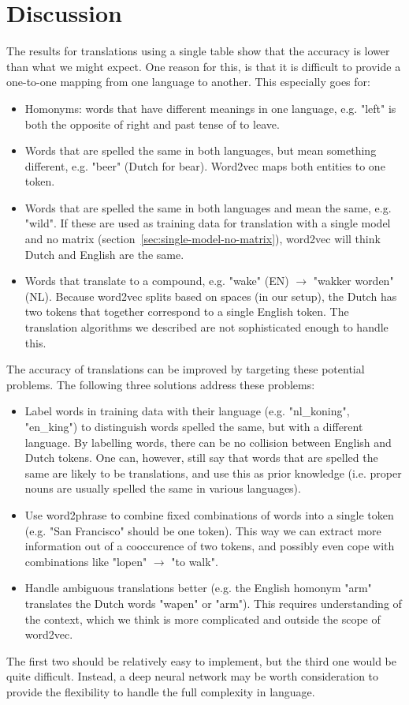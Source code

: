 \section{Discussion}
\label{sec:discussion}

The results for translations using a single table show that the accuracy is lower than what we might expect. One reason for this, is that it is difficult to provide a one-to-one mapping from one language to another. This especially goes for:
\begin{itemize}
\item Homonyms: words that have different meanings in one language, e.g. "left" is both the opposite of right and past tense of to leave.
\item Words that are spelled the same in both languages, but mean something different, e.g. "beer" (Dutch for bear). Word2vec maps both entities to one token.
\item Words that are spelled the same in both languages and mean the same, e.g. "wild". If these are used as training data for translation with a single model and no matrix (section~\ref{sec:single-model-no-matrix}), word2vec will think Dutch and English are the same.
\item Words that translate to a compound, e.g. "wake" (EN) $\to$ "wakker worden" (NL). Because word2vec splits based on spaces (in our setup), the Dutch has two tokens that together correspond to a single English token. The translation algorithms we described are not sophisticated enough to handle this.
\end{itemize}

The accuracy of translations can be improved by targeting these potential problems. The following three solutions address these problems:

\begin{itemize}
\item Label words in training data with their language (e.g. "nl\_koning", "en\_king") to distinguish words spelled the same, but with a different language. By labelling words, there can be no collision between English and Dutch tokens. One can, however, still say that words that are spelled the same are likely to be translations, and use this as prior knowledge (i.e. proper nouns are usually spelled the same in various languages).
\item Use word2phrase to combine fixed combinations of words into a single token (e.g. "San Francisco" should be one token). This way we can extract more information out of a cooccurence of two tokens, and possibly even cope with combinations like "lopen" $\to$ "to walk".
\item Handle ambiguous translations better (e.g. the English homonym "arm" translates the Dutch words "wapen" or "arm"). This requires understanding of the context, which we think is more complicated and outside the scope of word2vec.
\end{itemize}

The first two should be relatively easy to implement, but the third one would be quite difficult. Instead, a deep neural network may be worth consideration to provide the flexibility to handle the full complexity in language.
